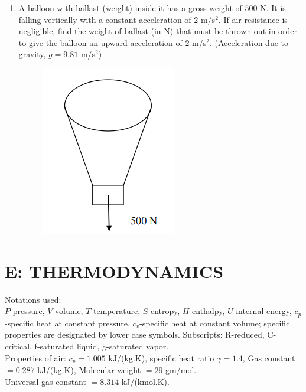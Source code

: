 \documentclass[a4paper,10pt]{article}
\begin{document}
\begin{enumerate}
    \hfill{}
    \begin{enumerate}
    \end{enumerate}
    
    \item A balloon with ballast (weight) inside it has a gross weight of $500$ N. It is falling vertically with a constant acceleration of $2$ m/s$^2$. If air resistance is negligible, find the weight of ballast (in N) that must be thrown out in order to give the balloon an upward acceleration of $2$ m/s$^2$. (Acceleration due to gravity, $g = 9.81$ m/s$^2$)
    \begin{figure}[H] \centering \includegraphics[width=0.3\columnwidth]{q22_solid.png} \caption*{} \label{fig:q22_solid} \end{figure}
    
    \hfill{}
\end{enumerate}
\clearpage

\section*{E: THERMODYNAMICS}
Notations used: \\
$P$-pressure, $V$-volume, $T$-temperature, $S$-entropy, $H$-enthalpy, $U$-internal energy, $c_p$-specific heat at constant pressure, $c_v$-specific heat at constant volume; specific properties are designated by lower case symbols.
Subscripts: R-reduced, C-critical, f-saturated liquid, g-saturated vapor. \\
Properties of air: $c_p = 1.005$ kJ/(kg.K), specific heat ratio $\gamma = 1.4$, Gas constant $= 0.287$ kJ/(kg.K), Molecular weight $= 29$ gm/mol. \\
Universal gas constant $= 8.314$ kJ/(kmol.K).
\end{document}
